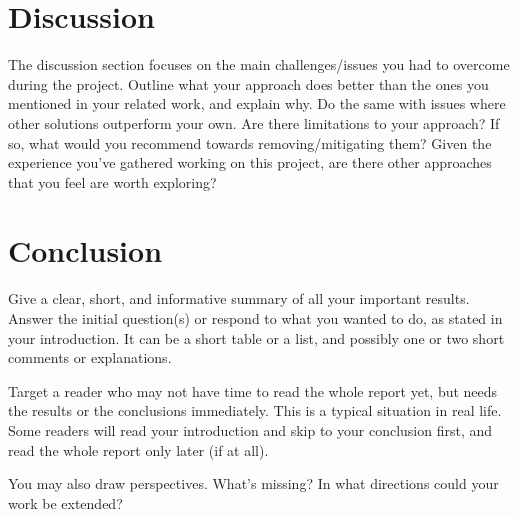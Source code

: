 \documentclass{scrartcl}
\begin{document}

\section{Discussion}
The discussion section focuses on the main challenges/issues you had to overcome during the project. Outline what your approach does better than the ones you mentioned in your related work, and explain why. Do the same with issues where other solutions  outperform your own. Are there limitations to your approach? If so, what would you recommend towards removing/mitigating them? Given the experience you've gathered working on this project, are there other approaches that you feel are worth exploring?

\section{Conclusion}

Give a clear, short, and informative summary of all your important results. Answer the initial question(s) or respond to what you wanted to do, as stated in your introduction. It can be a short table or a list, and possibly one or two short comments or explanations.

Target a reader who may not have time to read the whole report yet, but needs the results or the conclusions immediately. This is a typical situation in real life. Some readers will read your introduction and skip to your conclusion first, and read the whole report only later (if at all).

You may also draw perspectives. What's missing? In what directions could your work be extended?





\end{document}
